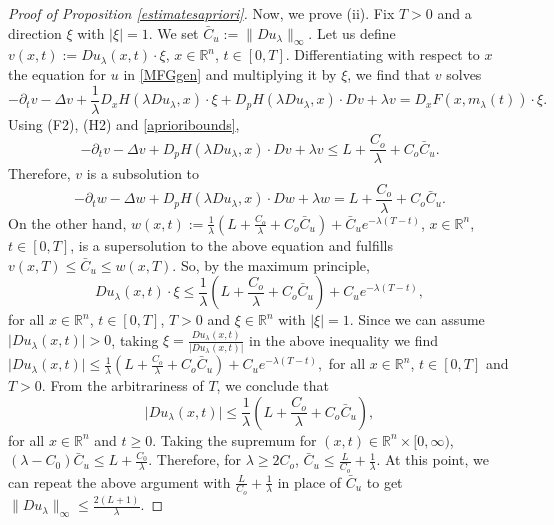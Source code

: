 \documentclass{amsart}
\theoremstyle{remark}
\theoremstyle{definition}
\theoremstyle{Claim}
\theoremstyle{plain}
\begin{document}
\begin{proof}[Proof of Proposition \ref{estimatesapriori}]
		Now, we prove (ii). Fix $T>0$ and a direction $\xi$ with $\lvert\xi\rvert=1$. We set $\bar{C}_u:=\lVert Du_\lambda\rVert_\infty$. Let us define $v(x,t):=Du_\lambda (x,t)\cdot\xi$, $x\in \mathbb{R}^n$, $t\in [0,T]$. Differentiating with respect to $x$ the equation for $u$ in \eqref{MFGgen} and multiplying it by $\xi$, we find that $v$ solves
		$$-\partial_t v-\Delta v+\frac{1}{\lambda}D_xH(\lambda Du_\lambda,x)\cdot \xi+D_pH(\lambda Du_\lambda,x)\cdot Dv+\lambda v=D_xF(x,m_\lambda(t))\cdot \xi.$$
		Using (F2), (H2) and \eqref{aprioribounds}, 
		$$-\partial_t v-\Delta v+D_pH(\lambda Du_\lambda,x)\cdot Dv+\lambda v\leq L+\frac{C_o}{\lambda}+C_o \bar{C}_u.$$
		Therefore, $v$ is a subsolution to 
		$$-\partial_t w-\Delta w+D_pH(\lambda Du_\lambda,x)\cdot Dw+\lambda w= L+\frac{C_o}{\lambda}+C_o \bar{C}_u.$$
		On the other hand, $w(x,t):=\frac{1}{\lambda}\left(L+\frac{C_o}{\lambda}+C_o \bar C_u\right)+\bar{C}_ue^{-\lambda(T-t)}$, $x\in \mathbb{R}^n$, $t\in [0,T]$, is a supersolution to the above equation and fulfills $v(x,T)\leq \bar{C}_u\leq w(x,T)$. So, by the maximum principle, $$Du_\lambda(x,t)\cdot \xi\leq \frac{1}{\lambda}\left(L+\frac{C_o}{\lambda}+C_o \bar{C}_u\right)+C_ue^{-\lambda(T-t)},$$
		for all $x\in \mathbb{R}^n$, $t\in [0,T]$, $T>0$ and $\xi\in \mathbb{R}^n$ with $\lvert\xi\rvert=1$. Since we can assume $\lvert Du_\lambda(x,t)\rvert>0$, taking $\xi=\frac{Du_\lambda(x,t)}{\lvert Du_\lambda(x,t)\rvert}$ in the above inequality we find
		$\lvert Du_\lambda(x,t)\rvert\leq \frac{1}{\lambda}\left(L+\frac{C_o}{\lambda}+C_o \bar{C}_u\right)+C_ue^{-\lambda(T-t)},$
		for all $x\in \mathbb{R}^n$, $t\in [0,T]$ and $T>0$. From the arbitrariness of $T$, we conclude that
		$$\lvert Du_\lambda(x,t)\rvert\leq \frac{1}{\lambda}\left(L+\frac{C_o}{\lambda}+C_o \bar{C}_u\right),$$
		for all $x\in \mathbb{R}^n$ and $t\geq 0$. Taking the supremum for $(x,t)\in\mathbb{R}^n\times [0,\infty)$, 
		$(\lambda -C_0)\bar{C}_u\leq L+\frac{C_0}{\lambda}.$	Therefore, for $\lambda\geq 2C_o$, $\bar{C}_u\leq \frac{L}{C_o}+\frac{1}{\lambda}$. At this point, we can repeat the above argument with $\frac{L}{C_o}+\frac{1}{\lambda}$ in place of $\bar{C}_u$ to get 
		$\lVert Du_\lambda\rVert_\infty\leq \frac{2(L+1)}{\lambda}.$
		
		\vspace{0.3cm}
		

\end{proof}
\end{document}
